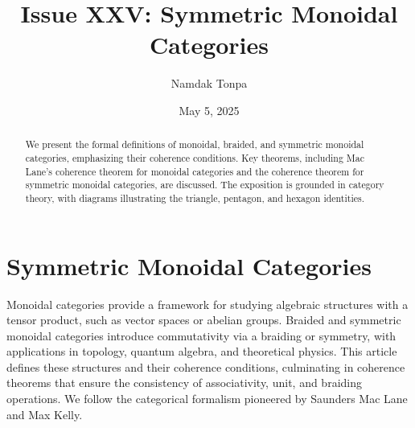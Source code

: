 \documentclass{article}
\theoremstyle{plain}
\theoremstyle{remark}
\begin{document}
\title{Issue XXV: Symmetric Monoidal Categories}
\author{Namdak Tonpa}
\date{May 5, 2025}

\maketitle

\begin{abstract}
We present the formal definitions of monoidal, braided, and symmetric monoidal categories, emphasizing their coherence conditions. Key theorems, including Mac Lane's coherence theorem for monoidal categories and the coherence theorem for symmetric monoidal categories, are discussed. The exposition is grounded in category theory, with diagrams illustrating the triangle, pentagon, and hexagon identities.
\end{abstract}

\ifincludeTOC
  \tableofcontents
\fi

\section{Symmetric Monoidal Categories}

Monoidal categories provide a framework for studying algebraic structures with a tensor product,
such as vector spaces or abelian groups. Braided and symmetric monoidal categories introduce
commutativity via a braiding or symmetry, with applications in topology, quantum algebra,
and theoretical physics. This article defines these structures and their coherence conditions,
culminating in coherence theorems that ensure the consistency of associativity, unit,
and braiding operations. We follow the categorical formalism pioneered by
Saunders Mac Lane and Max Kelly.
\end{document}
